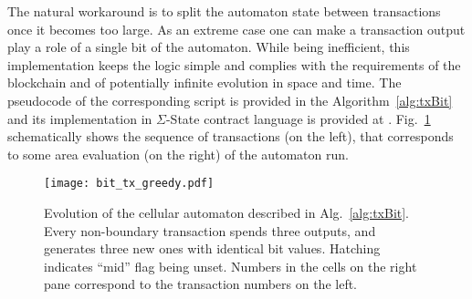 \documentclass[runningheads]{llncs}
\begin{document}
    The natural workaround is to split the automaton state between
    transactions once it becomes too large. As an extreme case one can make a
    transaction output play a role of a single bit of the automaton. While being
    inefficient, this implementation keeps the logic simple and complies with the
    requirements of the blockchain and of potentially infinite evolution in
    space and time. The pseudocode of the corresponding script is
    provided in the Algorithm~\ref{alg:txBit} and its implementation in $\Sigma$-State
    contract language is provided at \cite{ergoScript2}. Fig.~\ref{fig:bit_txs}
    schematically shows the sequence of transactions (on the left), that corresponds
    to some area evaluation (on the right) of the automaton run.
    \begin{figure}[h]
        \centering
        \texttt{[image: bit\_tx\_greedy.pdf]}
        \caption{Evolution of the cellular automaton described in
            Alg.~\ref{alg:txBit}. Every non-boundary transaction spends three
            outputs, and generates three new ones with identical bit values.
            Hatching indicates ``mid'' flag being unset. Numbers in the cells on
            the right pane correspond to the transaction numbers on the left.
        \label{fig:bit_txs} }
    \end{figure}
\end{document}
